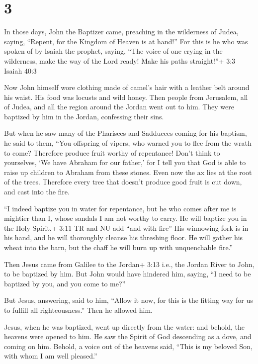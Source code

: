 \hypertarget{section-2}{%
\section{3}\label{section-2}}

 In those days, John the Baptizer came, preaching in the
wilderness of Judea, saying,  ``Repent, for the Kingdom of
Heaven is at hand!''  For this is he who was spoken of by
Isaiah the prophet, saying, ``The voice of one crying in the wilderness,
make the way of the Lord ready! Make his paths straight!''+ 3:3 Isaiah
40:3

 Now John himself wore clothing made of camel's hair with a
leather belt around his waist. His food was locusts and wild honey.
 Then people from Jerusalem, all of Judea, and all the
region around the Jordan went out to him.  They were
baptized by him in the Jordan, confessing their sins.

 But when he saw many of the Pharisees and Sadducees coming
for his baptism, he said to them, ``You offspring of vipers, who warned
you to flee from the wrath to come?  Therefore produce fruit
worthy of repentance!  Don't think to yourselves, `We have
Abraham for our father,' for I tell you that God is able to raise up
children to Abraham from these stones.  Even now the ax
lies at the root of the trees. Therefore every tree that doesn't produce
good fruit is cut down, and cast into the fire.

 ``I indeed baptize you in water for repentance, but he who
comes after me is mightier than I, whose sandals I am not worthy to
carry. He will baptize you in the Holy Spirit.+ 3:11 TR and NU add ``and
with fire''  His winnowing fork is in his hand, and he will
thoroughly cleanse his threshing floor. He will gather his wheat into
the barn, but the chaff he will burn up with unquenchable fire.''

 Then Jesus came from Galilee to the Jordan+ 3:13 i.e., the
Jordan River to John, to be baptized by him.  But John
would have hindered him, saying, ``I need to be baptized by you, and you
come to me?''

 But Jesus, answering, said to him, ``Allow it now, for
this is the fitting way for us to fulfill all righteousness.'' Then he
allowed him.

 Jesus, when he was baptized, went up directly from the
water: and behold, the heavens were opened to him. He saw the Spirit of
God descending as a dove, and coming on him.  Behold, a
voice out of the heavens said, ``This is my beloved Son, with whom I am
well pleased.''

